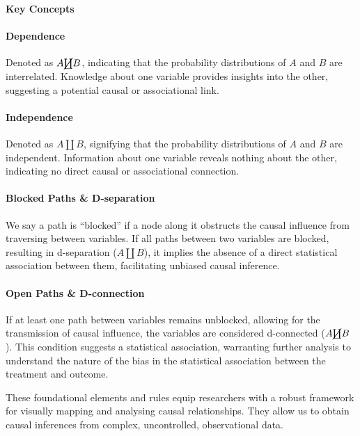 \documentclass[
  singlecolumn]{article}
\let\oldparagraph\paragraph
\renewcommand{\paragraph}[1]{\oldparagraph{#1}\mbox{}}
\begin{document}
\textbf{Key Concepts}

\paragraph{Dependence}\label{dependence}

Denoted as \(A \cancel\coprod B\), indicating that the probability
distributions of \(A\) and \(B\) are interrelated. Knowledge about one
variable provides insights into the other, suggesting a potential causal
or associational link.

\paragraph{Independence}\label{independence}

Denoted as \(A \coprod B\), signifying that the probability
distributions of \(A\) and \(B\) are independent. Information about one
variable reveals nothing about the other, indicating no direct causal or
associational connection.

\paragraph{Blocked Paths \&
D-separation}\label{blocked-paths-d-separation}

We say a path is ``blocked'' if a node along it obstructs the causal
influence from traversing between variables. If all paths between two
variables are blocked, resulting in d-separation (\(A \coprod B\)), it
implies the absence of a direct statistical association between them,
facilitating unbiased causal inference.

\paragraph{Open Paths \& D-connection}\label{open-paths-d-connection}

If at least one path between variables remains unblocked, allowing for
the transmission of causal influence, the variables are considered
d-connected (\(A \cancel\coprod B\)). This condition suggests a
statistical association, warranting further analysis to understand the
nature of the bias in the statistical association between the treatment
and outcome.

These foundational elements and rules equip researchers with a robust
framework for visually mapping and analysing causal relationships. They
allow us to obtain causal inferences from complex, uncontrolled,
observational data.
\end{document}
